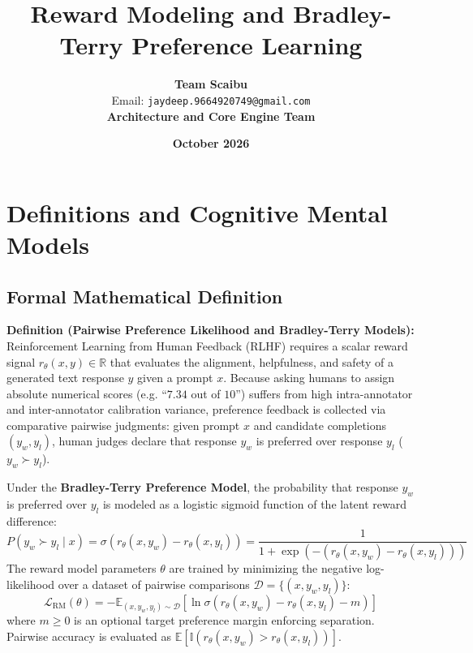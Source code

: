 \documentclass[11pt,a4paper]{article}
\title{\textbf{Reward Modeling and Bradley-Terry Preference Learning}}
\author{\textbf{Team Scaibu} \\ \small Email: \texttt{jaydeep.9664920749@gmail.com} \\ \small \textbf{Architecture and Core Engine Team}}
\date{\textbf{October 2026}}
\theoremstyle{definition}
\begin{document}
\maketitle

\section{Definitions and Cognitive Mental Models}

\subsection{Formal Mathematical Definition}
\textbf{Definition (Pairwise Preference Likelihood and Bradley-Terry Models):}
Reinforcement Learning from Human Feedback (RLHF) requires a scalar reward signal $r_\theta(x, y) \in \mathbb{R}$ that evaluates the alignment, helpfulness, and safety of a generated text response $y$ given a prompt $x$. Because asking humans to assign absolute numerical scores (e.g. ``$7.34$ out of $10$'') suffers from high intra-annotator and inter-annotator calibration variance, preference feedback is collected via comparative pairwise judgments: given prompt $x$ and candidate completions $(y_w, y_l)$, human judges declare that response $y_w$ is preferred over response $y_l$ ($y_w \succ y_l$).

Under the \textbf{Bradley-Terry Preference Model}, the probability that response $y_w$ is preferred over $y_l$ is modeled as a logistic sigmoid function of the latent reward difference:
{\boldmath
\begin{equation}
P(y_w \succ y_l \mid x) = \sigma\left( r_\theta(x, y_w) - r_\theta(x, y_l) \right) = \frac{1}{1 + \exp\left( -\left( r_\theta(x, y_w) - r_\theta(x, y_l) \right) \right)}
\end{equation}
}
The reward model parameters $\theta$ are trained by minimizing the negative log-likelihood over a dataset of pairwise comparisons $\mathcal{D} = \{(x, y_w, y_l)\}$:
{\boldmath
\begin{equation}
\mathcal{L}_{\text{RM}}(\theta) = - \mathbb{E}_{(x, y_w, y_l) \sim \mathcal{D}} \left[ \ln \sigma\left( r_\theta(x, y_w) - r_\theta(x, y_l) - m \right) \right]
\end{equation}
}
where $m \ge 0$ is an optional target preference margin enforcing separation. Pairwise accuracy is evaluated as $\mathbb{E}[\mathbb{I}(r_\theta(x, y_w) > r_\theta(x, y_l))]$.
\end{document}
